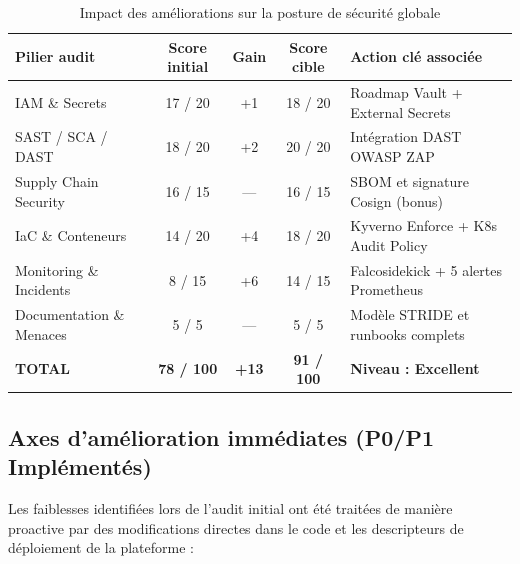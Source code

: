 \begin{table}[htbp]
\centering
\small
\renewcommand{\arraystretch}{1.2}
\begin{tabular}{|l|c|c|c|l|}
\hline
\textbf{Pilier audit} & \textbf{Score initial} & \textbf{Gain} & \textbf{Score cible} & \textbf{Action clé associée} \\
\hline
IAM \& Secrets & 17 / 20 & +1 & 18 / 20 & Roadmap Vault + External Secrets \\
\hline
SAST / SCA / DAST & 18 / 20 & +2 & 20 / 20 & Intégration DAST OWASP ZAP \\
\hline
Supply Chain Security & 16 / 15 & — & 16 / 15 & SBOM et signature Cosign (bonus) \\
\hline
IaC \& Conteneurs & 14 / 20 & +4 & 18 / 20 & Kyverno Enforce + K8s Audit Policy \\
\hline
Monitoring \& Incidents & 8 / 15 & +6 & 14 / 15 & Falcosidekick + 5 alertes Prometheus \\
\hline
Documentation \& Menaces & 5 / 5 & — & 5 / 5 & Modèle STRIDE et runbooks complets \\
\hline
\textbf{TOTAL} & \textbf{78 / 100} & \textbf{+13} & \textbf{91 / 100} & \textbf{Niveau : Excellent} \\
\hline
\end{tabular}
\caption{Impact des améliorations sur la posture de sécurité globale}
\label{tab:score-maturite-devsecops}
\end{table}

\subsection{Axes d'amélioration immédiates (P0/P1 Implémentés)}
\label{subsec:axes-amelioration-immediates}

Les faiblesses identifiées lors de l'audit initial ont été traitées de manière proactive par des modifications directes dans le code et les descripteurs de déploiement de la plateforme :

